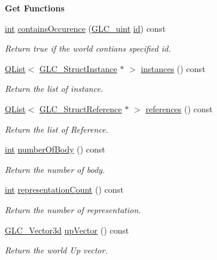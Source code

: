 \begin{Indent}{\bf Get Functions}
\begin{DoxyCompactItemize}
\hyperlink{ioapi_8h_a787fa3cf048117ba7123753c1e74fcd6}{int} \hyperlink{class_g_l_c___world_adbfbdf06aa72fbb35c2f801513d02ced}{contains\-Occurence} (\hyperlink{glc__global_8h_abf950976fabed69026558df8e2da6c6b}{G\-L\-C\-\_\-uint} \hyperlink{glext_8h_a58c2a664503e14ffb8f21012aabff3e9}{id}) const 
\begin{DoxyCompactList}\small\item\em Return true if the world contians specified id. \end{DoxyCompactList}\item 
\hyperlink{class_q_list}{Q\-List}$<$ \hyperlink{class_g_l_c___struct_instance}{G\-L\-C\-\_\-\-Struct\-Instance} $\ast$ $>$ \hyperlink{class_g_l_c___world_a7d460929d0fc53d818e2495b829bdfd7}{instances} () const 
\begin{DoxyCompactList}\small\item\em Return the list of instance. \end{DoxyCompactList}\item 
\hyperlink{class_q_list}{Q\-List}$<$ \hyperlink{class_g_l_c___struct_reference}{G\-L\-C\-\_\-\-Struct\-Reference} $\ast$ $>$ \hyperlink{class_g_l_c___world_ac5652c496fbd5ab2a0707f3bff20056b}{references} () const 
\begin{DoxyCompactList}\small\item\em Return the list of Reference. \end{DoxyCompactList}\item 
\hyperlink{ioapi_8h_a787fa3cf048117ba7123753c1e74fcd6}{int} \hyperlink{class_g_l_c___world_a5404544d2dc3f96dc2210cfee242d958}{number\-Of\-Body} () const 
\begin{DoxyCompactList}\small\item\em Return the number of body. \end{DoxyCompactList}\item 
\hyperlink{ioapi_8h_a787fa3cf048117ba7123753c1e74fcd6}{int} \hyperlink{class_g_l_c___world_a6ffaa5eb6d68426a805e5f9e9bf10b42}{representation\-Count} () const 
\begin{DoxyCompactList}\small\item\em Return the number of representation. \end{DoxyCompactList}\item 
\hyperlink{class_g_l_c___vector3d}{G\-L\-C\-\_\-\-Vector3d} \hyperlink{class_g_l_c___world_ad62918e26701da4a5ea125f1c6dd5862}{up\-Vector} () const 
\begin{DoxyCompactList}\small\item\em Return the world Up vector. \end{DoxyCompactList}\item 

\end{DoxyCompactItemize}
\end{Indent}
